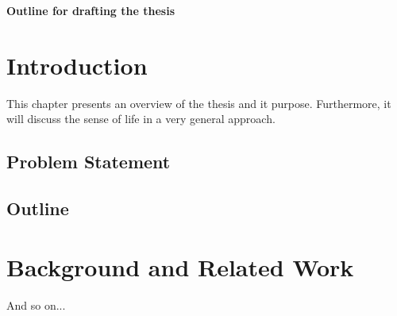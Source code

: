 \clearemptydoublepage
{}
{}
\begin{center}
	\huge{\bf Outline for drafting the thesis}
\end{center}
\section{Introduction}

This chapter presents an overview of the thesis and it purpose. Furthermore, it will discuss the sense of life in a very general approach.

\subsection{Problem Statement}
\subsection{Outline}
\section{Background and Related Work}

And so on...


